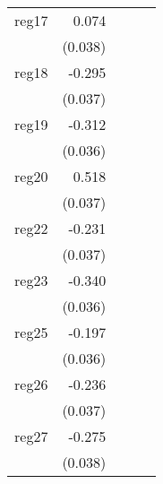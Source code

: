{\begin{longtable}{l*{4}{D{.}{.}{-1}}}
\addlinespace
reg17       &       0.074         &                     &                     &                     \\
            &     (0.038)         &                     &                     &                     \\
\addlinespace
reg18       &      -0.295\sym{***}&                     &                     &                     \\
            &     (0.037)         &                     &                     &                     \\
\addlinespace
reg19       &      -0.312\sym{***}&                     &                     &                     \\
            &     (0.036)         &                     &                     &                     \\
\addlinespace
reg20       &       0.518\sym{***}&                     &                     &                     \\
            &     (0.037)         &                     &                     &                     \\
\addlinespace
reg22       &      -0.231\sym{***}&                     &                     &                     \\
            &     (0.037)         &                     &                     &                     \\
\addlinespace
reg23       &      -0.340\sym{***}&                     &                     &                     \\
            &     (0.036)         &                     &                     &                     \\
\addlinespace
reg25       &      -0.197\sym{***}&                     &                     &                     \\
            &     (0.036)         &                     &                     &                     \\
\addlinespace
reg26       &      -0.236\sym{***}&                     &                     &                     \\
            &     (0.037)         &                     &                     &                     \\
\addlinespace
reg27       &      -0.275\sym{***}&                     &                     &                     \\
            &     (0.038)         &                     &                     &                     \\

\end{longtable}}
